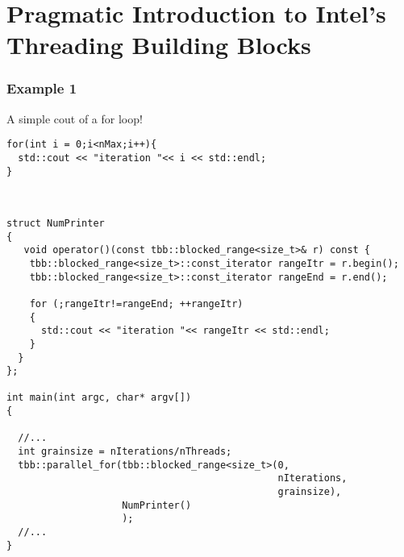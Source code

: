 \documentclass[a4paper]{article}
\begin{document}
\part*{Pragmatic Introduction to Intel's Threading Building Blocks}
\label{part:all}

 
\section*{Example 1}
\large
A simple cout of a for loop!\\
   \begin{lstlisting}[float=ht,caption={\large \textbf{Serial}}]
for(int i = 0;i<nMax;i++){
  std::cout << "iteration "<< i << std::endl;
}
   \end{lstlisting}
\\
   \begin{lstlisting}[float=ht,caption={\large \textbf{Parallel}}]
struct NumPrinter
{
   void operator()(const tbb::blocked_range<size_t>& r) const {
    tbb::blocked_range<size_t>::const_iterator rangeItr = r.begin();
    tbb::blocked_range<size_t>::const_iterator rangeEnd = r.end();
   
    for (;rangeItr!=rangeEnd; ++rangeItr)
    {
      std::cout << "iteration "<< rangeItr << std::endl;
    }
  }
};

int main(int argc, char* argv[])
{

  //...
  int grainsize = nIterations/nThreads;
  tbb::parallel_for(tbb::blocked_range<size_t>(0,
                                               nIterations,
                                               grainsize),
                    NumPrinter()
                    );
  //...
}
   \end{lstlisting}
  
\newpage
\end{document}
